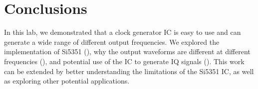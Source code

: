 \documentclass{article}
\begin{document}
\section{Conclusions}
In this lab, we demonstrated that a clock generator IC is easy to use and can generate a wide range of different output frequencies.
We explored the implementation of Si5351 (), why the output waveforms are different at different frequencies (), and potential use of the IC to generate IQ signals ().
This work can be extended by better understanding the limitations of the Si5351 IC, as well as exploring other potential applications.
\end{document}
